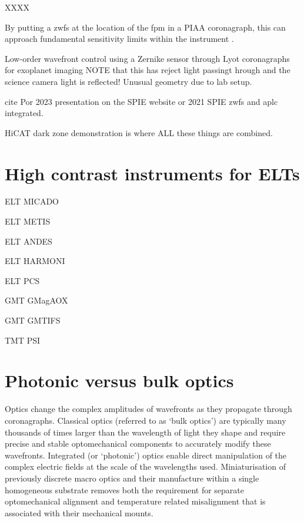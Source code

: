 \documentclass[letterpaper]{ar-1col}
\begin{document}
XXXX

%
By putting a \ac{zwfs} at the location of the \ac{fpm} in a PIAA coronagraph, this can approach fundamental sensitivity limits within the instrument \citep{Haffert23}.


Low-order wavefront control using a Zernike sensor through Lyot coronagraphs for exoplanet imaging
\citep{Pourcelot22,Pourcelot23} NOTE that this has reject light passingt hrough and the science camera light is reflected! Unusual geometry due to lab setup.

cite Por 2023 presentation on the SPIE website or 2021 SPIE \ac{zwfs} and \ac{aplc} integrated. 


HiCAT dark zone demonstration \citep{Soummer22} is where ALL these things are combined. 


\section{High contrast instruments for ELTs}

ELT	MICADO

ELT	METIS

ELT	ANDES

ELT	HARMONI

ELT	PCS

GMT	GMagAOX

GMT	GMTIFS

TMT	PSI



\section{Photonic versus bulk optics}

Optics change the complex amplitudes of wavefronts as they propagate through coronagraphs.
%
Classical optics (referred to as `bulk optics') are typically many thousands of times larger than the wavelength of light they shape and require precise and stable optomechanical components to accurately modify these wavefronts.
%
Integrated (or `photonic') optics enable direct manipulation of the complex electric fields at the scale of the wavelengths used.
%
Miniaturisation of previously discrete macro optics and their manufacture within a single homogeneous substrate removes both the requirement for separate optomechanical alignment and temperature related misalignment that is associated with their mechanical mounts.
%
\end{document}
